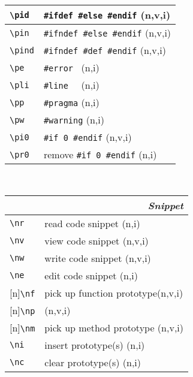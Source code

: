\documentclass[oneside,11pt,landscape,DIV16]{scrartcl}
\newcommand{\Rep}{{\tiny{[n]}}}
\begin{document}
\begin{multicols}{3}
\begin{center}
\begin{tabular}[]{|p{15mm}|p{55mm}|}
\hline \verb'\pid'  & \verb'#ifdef #else #endif'   \hfill (n,v,i)\\
\hline \verb'\pin'  & \verb'#ifndef #else #endif'  \hfill (n,v,i)\\
\hline \verb'\pind' & \verb'#ifndef #def #endif'   \hfill (n,v,i)\\
\hline \verb'\pe'   & \verb'#error '               \hfill (n,i)\\
\hline \verb'\pli'  & \verb'#line  '               \hfill (n,i)\\
\hline \verb'\pp'   & \verb'#pragma'               \hfill (n,i)\\
\hline \verb'\pw'   & \verb'#warning'              \hfill (n,i)\\
\hline \verb'\pi0'  & \verb'#if 0 #endif'          \hfill (n,v,i)\\
\hline \verb'\pr0'  & remove \verb'#if 0 #endif'   \hfill (n,i)\\
\hline
\end{tabular} \\
%
%
\begin{tabular}[]{|p{11mm}|p{60mm}|}%
\hline 
\multicolumn{2}{|r|}{\textsl{S\textbf{n}ippet}} \\
\hline     \verb'\nr'  & read code snippet         \hfill (n,i)\\
\hline     \verb'\nv'  & view code snippet         \hfill (n,v,i)\\
\hline     \verb'\nw'  & write code snippet        \hfill (n,v,i)\\
\hline     \verb'\ne'  & edit code snippet         \hfill (n,i)\\
\hline \Rep\verb'\nf'  & pick up function prototype\hfill (n,v,i)\\
       \Rep\verb'\np'  &                           \hfill (n,v,i)\\
\hline \Rep\verb'\nm'  & pick up method prototype  \hfill (n,v,i)\\
\hline     \verb'\ni'  & insert prototype(s)       \hfill (n,i)\\
\hline     \verb'\nc'  & clear  prototype(s)       \hfill (n,i)\\

\end{tabular}
\end{center}
\end{multicols}
\end{document}
